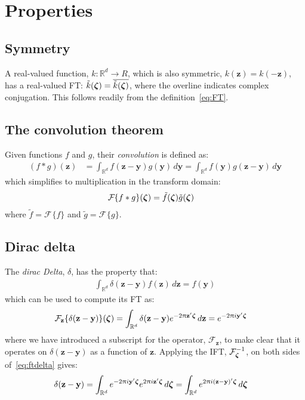 \documentclass[a4paper,oneside,12pt,english]{report}
\def\zvec{\mathbf{z}}
\def\R{\mathbb{R}}
\def\yvec{\mathbf{y}}
\def\funcdef#1#2#3{#1:#2\to#3}
\def\Fset{\mathcal{F}}
\newcommand\FT[2][]{\Fset_{#1}\{#2\}}
\def\conj#1{\overline{#1}}
\begin{document}
\section{Properties}

\subsection{Symmetry}
A real-valued function, $\funcdef{k}{\R^d}{R}$, which is also symmetric, $k(\zvec)=k(-\zvec)$, has a real-valued FT: $\tilde k(\zetavec) = \conj{\tilde k(\zetavec)}$, where the overline indicates complex conjugation. This follows readily from the definition~\eqref{eq:FT}.

\subsection{The convolution theorem}
Given functions $f$ and $g$, their \emph{convolution} is defined as:
\begin{align}
(f\ast g)(\zvec) &= \int_{\R^d} f(\zvec-\yvec)g(\yvec)\,d\yvec
= \int_{\R^d} f(\yvec)g(\zvec-\yvec)\,d\yvec
\end{align}
which simplifies to multiplication in the transform domain:
\begin{align}
\FT{f\ast g}(\zetavec) &= \tilde f(\zetavec)\tilde g(\zetavec)
\end{align}
where $\tilde f=\FT{f}$ and $\tilde g=\FT{g}$.


\subsection{Dirac delta}
The \emph{dirac Delta}, $\delta$, has the property that:
\begin{align}
\label{eq:delta}
\int_{\R^d} \delta(\zvec-\yvec) f(\zvec) \,d\zvec = f(\yvec) 
\end{align}
which can be used to compute its FT as:
\begin{align}
\label{eq:ftdelta}
\FT[\zvec]{\delta(\zvec-\yvec)}(\zetavec) &= \int_{\R^d} \delta(\zvec-\yvec)e^{-2\uppi\zvec'\zetavec}\,d\zvec
= e^{-2\uppi i\yvec'\zetavec}
\end{align}
where we have introduced a subscript for the operator, $\Fset_\zvec$, to make clear that it operates on $\delta(\zvec-\yvec)$ as a function of $\zvec$. Applying the IFT, $\Fset_{\zetavec}^{-1}$, on both sides of~\eqref{eq:ftdelta} gives:
\begin{align}
\label{eq:iftdelta}
\delta(\zvec-\yvec) &= \int_{\R^d} e^{-2\uppi i\yvec'\zetavec} e^{2\uppi i \zvec'\zetavec} \,d\zetavec
= \int_{\R^d} e^{2\uppi i(\zvec-\yvec)'\zetavec} \,d\zetavec
\end{align}
\end{document}
